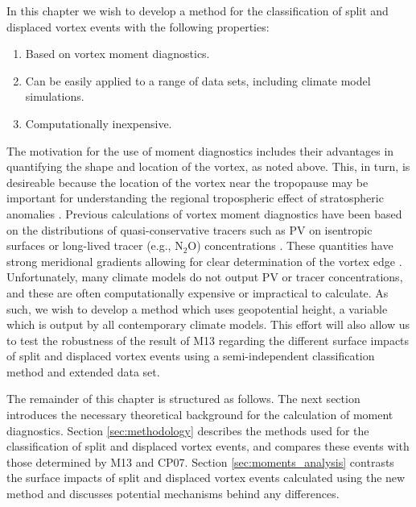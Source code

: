 In this chapter we wish to develop a method for the classification of split and
displaced vortex events with the following properties:
\begin{enumerate}
\item Based on vortex moment diagnostics.
\item Can be easily applied to a range of data sets, including climate model
  simulations.
\item Computationally inexpensive. 
\end{enumerate}
The motivation for the use of moment diagnostics includes their advantages in
quantifying the shape and location of the vortex, as noted above. This, in turn,
is desireable because the location of the vortex near the tropopause may be
important for understanding the regional tropospheric effect of stratospheric
anomalies \citep[e.g.,][Section \ref{sec:mechanisms}]{Ambaum2002}. Previous
calculations of vortex moment diagnostics have been based on the distributions
of quasi-conservative tracers such as PV on isentropic surfaces
\citep{Mitchell2011} or long-lived tracer (e.g., N$_{2}$O) concentrations
\citep{Waugh1997}. These quantities have strong meridional gradients allowing
for clear determination of the vortex edge \citep{Nash1996}. Unfortunately, many
climate models do not output PV or tracer concentrations, and these are often
computationally expensive or impractical to calculate. As such, we wish to
develop a method which uses geopotential height, a variable which is output by
all contemporary climate models. This effort will also allow us to test the
robustness of the result of M13 regarding the different surface impacts of split
and displaced vortex events using a semi-independent classification method and
extended data set.

The remainder of this chapter is structured as follows. The next section
introduces the necessary theoretical background for the calculation of moment
diagnostics. Section \ref{sec:methodology} describes the methods used for the
classification of split and displaced vortex events, and compares these events
with those determined by M13 and CP07. Section \ref{sec:moments_analysis}
contrasts the surface impacts of split and displaced vortex events calculated
using the new method and discusses potential mechanisms behind any differences. 


